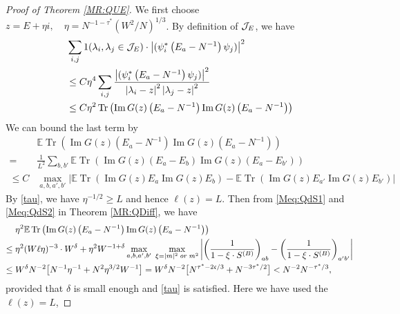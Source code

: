 \documentclass[10pt,reqno]{article}
\DeclareMathOperator{\tr}{Tr}
\theoremstyle{plain} %
\theoremstyle{remark}
\numberwithin{equation}{section}
\begin{document}
 

\begin{proof}[Proof of Theorem \ref{MR:QUE}]  

We first choose  $  z=E+\eta i, \quad \eta= N^{-1-\tau ^* }(W^2/N)^{1/3}$.
By definition of $ {\cal J}_E$, we have 
\begin{align}\label{ssfa2}
& \sum_{i,j} \textbf{1}(\lambda_i,\lambda_j\in {\cal J}_E)\cdot \left|(\psi_i^*\left(E_a-N^{-1}\right) \psi_j)\right|^2 \nonumber \\
& 
\le C \eta^4 \sum_{i, j  } \frac{\left|(\psi_i^*\left(E_a-N^{-1}\right) \psi_j)\right|^2}{\left|\lambda_i-z\right|^2\left|\lambda_j-z\right|^2}\\\nonumber
& \le 
 C \eta^2\tr \left(\operatorname{Im} G(z)\left(E_a-N^{-1}\right) \operatorname{Im} G(z)\left(E_a-N^{-1}\right)\right)
\end{align}
We can bound the last term by 
\begin{align}\label{que0} 
 &\mathbb{E}  \tr \left(\operatorname{Im} G(z)\left(E_a-N^{-1}\right) \operatorname{Im} G(z)\left(E_a-N^{-1}\right)\right)
  \\ 
=&\frac{1}{L^2}\sum_{b,b'}
\mathbb{E}  
 \tr \left(\operatorname{Im} G(z)\left(E_a-E_b\right) \operatorname{Im} G(z)\left(E_a-E_{b'}\right)\right)
\nonumber \\ \nonumber
\le C&\max_{a,b,a',b'}
\Big|\mathbb{E}\tr \left(\operatorname{Im} G(z) E_a  \operatorname{Im} G(z)E_b \right)
-\mathbb{E}\tr \left(\operatorname{Im} G(z) E_{a'}  \operatorname{Im} G(z)E_{b'}\right) \Big| 
\end{align}
By \eqref{tau},    we have $ \eta^{-1/2} \ge L$ and hence $\ell(z)=L$.
Then from \eqref{Meq:QdS1} and \eqref{Meq:QdS2} in Theorem \ref{MR:QDiff}, 
we have 
 \begin{align}
 \;& \eta^2 \mathbb{E}  \tr \left(\operatorname{Im} G(z)\left(E_a-N^{-1}\right) \operatorname{Im} G(z)\left(E_a-N^{-1}\right)\right)
\nonumber \\
\le \;& \eta^2 (W\ell\eta)^{-3}\cdot W^{\delta} + \eta^2 W^{-1+\delta}\max_{a,b,a',b'}\;\max_{ \xi=|m|^2 \; \rm or\; m^2}
\left| \left(\frac{1}{1-\xi\cdot S^{(B)}}\right)_{ab}-\left(\frac{1}{1-\xi\cdot S^{(B)}}\right)_{a'b'}\right|
\nonumber \\\nonumber
\le \;&   W^{\delta} N^{-2} \big [ N^{-1}\eta^{-1}  +  N^2 \eta^{3/2} W^{-1}  \big ] =   W^{\delta} N^{-2} \big [ N^{\tau ^*-2 \mathfrak c /3}  + N^{-3 \tau ^*/2}  \big ] 
<   N^{-2}  N^{- \tau ^* /3},  
 \end{align}
provided that  $\delta$ is small enough and \eqref{tau} is satisfied. Here  we have used  the $\ell(z)=L$, 

\end{proof}
\end{document}
